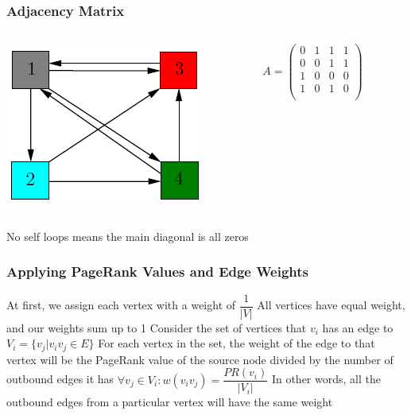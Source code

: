 \documentclass{beamer}
\begin{document}
\begin{frame}
\frametitle{Adjacency Matrix}
\begin{columns}
    \begin{column}{0.5\textwidth}
        \centering
        \includegraphics[width=\textwidth]{unweighted.png}
    \end{column}
    \begin{column}{0.5\textwidth}
        \centering
        {\Large$A = \begin{pmatrix}
            0 & 1 & 1 & 1\\
            0 & 0 & 1 & 1\\
            1 & 0 & 0 & 0\\
            1 & 0 & 1 & 0\\
        \end{pmatrix}$}
    \end{column}
\end{columns}
\begin{outline}
    \1 No self loops means the main diagonal is all zeros
\end{outline}
\end{frame}
\begin{frame}[t]
\frametitle{Applying PageRank Values and Edge Weights}
\begin{outline}
    \1 At first, we assign each vertex with a weight of $\dfrac{1}{|V|}$
        \2 All vertices have equal weight, and our weights sum up to 1
    \1 Consider the set of vertices that $v_i$ has an edge to 
        \2 $V_i = \{v_j | v_iv_j \in E\}$
    \1 For each vertex in the set, the weight of the edge to that vertex will be the PageRank value of the source node divided by the number of outbound edges it has
        \2 $\forall v_j \in V_i: w(v_iv_j) = \dfrac{PR(v_i)}{|V_i|}$
    \1 In other words, all the outbound edges from a particular vertex will have the same weight
\end{outline}
\end{frame}
\end{document}
